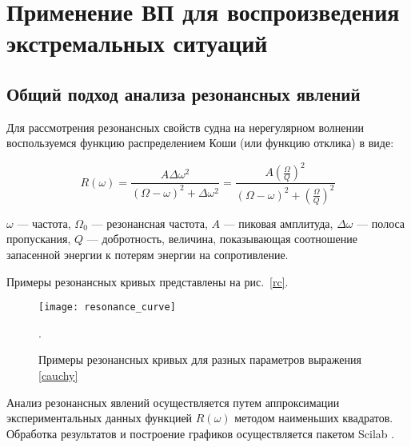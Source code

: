 \chapter{Применение ВП для воспроизведения экстремальных ситуаций}

\section{Общий подход анализа резонансных явлений}

Для рассмотрения резонансных свойств судна на нерегулярном волнении воспользуемся функцию распределением Коши (или функцию отклика) в виде:

\begin{equation}
	R(\omega) = \frac{A \Delta \omega^2} {  (\Omega-\omega)^2 + \Delta \omega^2 } 
		 = \frac{A \left( \frac{\Omega}{Q} \right) ^2} {  (\Omega-\omega)^2 + \left( \frac{\Omega}{Q} \right) ^2 } 
\label{cauchy}
\end{equation}

$\omega$ --- частота, $\Omega_0$ --- резонансная частота, $A$ --- пиковая амплитуда, $\Delta \omega$ --- полоса пропускания, $Q$ --- добротность, величина, показывающая соотношение запасенной энергии к потерям энергии на сопротивление.

Примеры резонансных кривых представлены на рис.~\ref{rc}.

\begin{figure}[h!]
\begin{center}
\texttt{[image: resonance\_curve]}
\end{center}
\caption{Примеры резонансных кривых для разных параметров выражения \eqref{cauchy}}.
\end{figure}

Анализ резонансных явлений осуществляется путем аппроксимации экспериментальных данных функцией $R(\omega)$ методом наименьших квадратов. Обработка результатов и построение графиков осуществляется пакетом Scilab \citep{scilab}.

